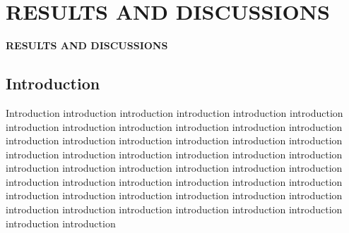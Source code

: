 \chapter{RESULTS AND DISCUSSIONS}
\pagebreak


\begin{center}
{\LARGE\textbf{RESULTS AND DISCUSSIONS}}
\end{center}


\section{Introduction}
Introduction introduction introduction introduction introduction introduction introduction introduction introduction introduction introduction introduction introduction introduction introduction introduction introduction introduction introduction introduction introduction introduction introduction introduction introduction introduction introduction introduction introduction introduction introduction introduction introduction introduction introduction introduction introduction introduction introduction introduction introduction introduction introduction introduction introduction introduction introduction introduction introduction introduction 